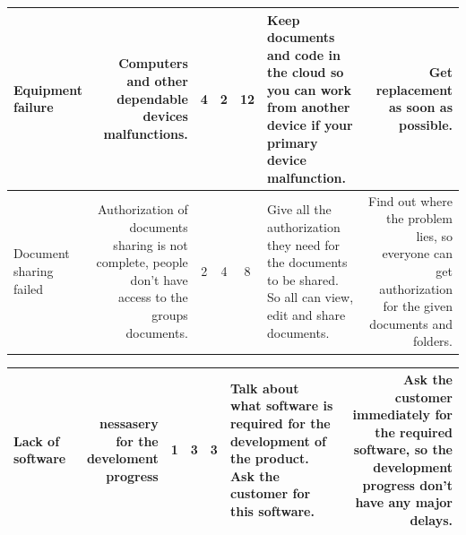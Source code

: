 \documentclass[12pt,a4paper,titlepage]{article}
\begin{document}
\begin{center}
\begin{tabulary}{\textwidth}{LRCCCLR}
\hline
Equipment failure & Computers and other dependable devices malfunctions. & 4 & 2 & 12 & Keep documents and code in the cloud so you can work from another device if your primary device malfunction. & Get replacement as soon as possible.\\ 
\hline
Document sharing failed & Authorization of documents sharing is not complete, people don't have access to the groups documents. & 2 & 4 & 8 & Give all the authorization they need for the documents to be shared. So all can view, edit and share documents. & Find out where the problem lies, so everyone can get authorization for the given documents and folders.\\ 
\hline
						\end{tabulary}
						\begin{tabulary}{\textwidth}{LRCCCLR} \toprule
Lack of software  & nessasery for the develoment progress & 1 & 3 & 3 & Talk about what software is required for the development of the product. Ask the customer for this software.   & Ask the customer immediately for the required software, so the development progress don't have any major delays. \\ 
\hline

						\end{tabulary}
					\end{center}
\end{document}
